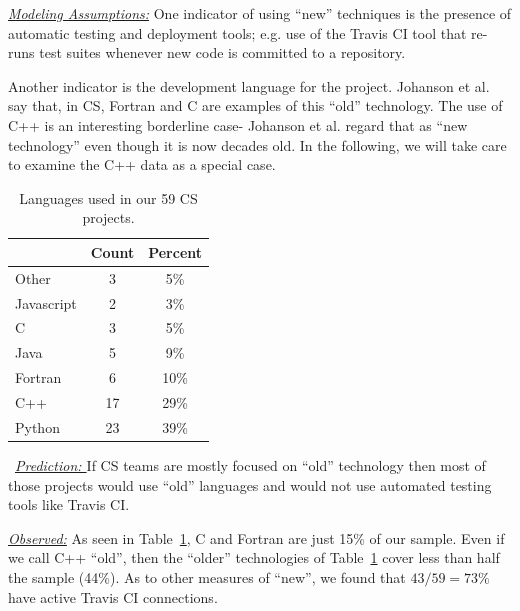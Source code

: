 \documentclass[sigconf]{acmart}
\begin{document}
\noindent \textit{\underline{Modeling Assumptions:}} 
One indicator of using ``new'' techniques is the presence of automatic testing and deployment tools; e.g. use of the Travis CI tool that re-runs test suites whenever new code is committed to a repository. 

Another indicator is the development language for the project. 
Johanson et al.~\cite{johan18_secs} say that, in CS, Fortran and C are examples of this ``old'' technology. The use of C++ is an interesting borderline case- Johanson et al. regard that as ``new technology'' even though it is now decades old. In the following, we will take care to examine the C++ data as a special case.




\begin{table}

\caption{Languages used in our 59 CS projects.  
}\label{tbl:language}
 \footnotesize
 \hspace{-3pt}\begin{tabular}{l|c|c}
 \multicolumn{1}{c|}{} & \multicolumn{1}{c|}{Count} & \multicolumn{1}{c}{Percent}\\
\hline
Other & 3 &  5\%  \\ 
Javascript	& 2 & 3\% \\ 
C &	3 & 5\% \\ 
Java	& 5 & 9\% \\ 
Fortran	& 6 & 10\% \\
C++	& 17 & 29\% \\
Python & 23 & 39\% 
\end{tabular}
\end{table} \noindent ~\textit{\underline{Prediction: }} If CS teams are mostly focused on ``old'' technology then most of those projects would use ``old'' languages and would not use automated testing
tools like  Travis CI.







\noindent\textit{\underline{Observed:}} 
As seen in Table~\ref{tbl:language}, C and Fortran are just 15\% of our sample.
Even if we call C++ ``old'', then the ``older'' technologies of Table~\ref{tbl:language}
cover less than half the sample (44\%).
 As to other measures of ``new'', we found that  $43/59=73\%$
have active
Travis CI connections.  
\end{document}
